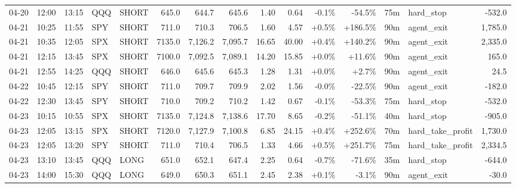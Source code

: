 \documentclass[11pt,a4paper,twoside]{article}
\begin{document}
\begin{landscape}
\begin{center}
\begin{longtable}{>{\color{txtmain}}l l l l l r r r r r r r r >{\color{txtmain}}l r}
04-20 & 12:00 & 13:15 & QQQ & SHORT & 645.0 & 644.7 & 645.6 & 1.40 & 0.64 & \textcolor{lossred}{-0.1\%} & \textcolor{lossred}{-54.5\%} & 75m & hard\_stop & \textcolor{lossred}{-532.0} \\
04-21 & 10:25 & 11:55 & SPY & SHORT & 711.0 & 710.3 & 706.5 & 1.60 & 4.57 & \textcolor{wingreen}{+0.5\%} & \textcolor{wingreen}{+186.5\%} & 90m & agent\_exit & \textcolor{wingreen}{1,785.0} \\
04-21 & 10:35 & 12:05 & SPX & SHORT & 7135.0 & 7,126.2 & 7,095.7 & 16.65 & 40.00 & \textcolor{wingreen}{+0.4\%} & \textcolor{wingreen}{+140.2\%} & 90m & agent\_exit & \textcolor{wingreen}{2,335.0} \\
04-21 & 12:15 & 13:45 & SPX & SHORT & 7100.0 & 7,092.5 & 7,089.1 & 14.20 & 15.85 & \textcolor{wingreen}{+0.0\%} & \textcolor{wingreen}{+11.6\%} & 90m & agent\_exit & \textcolor{wingreen}{165.0} \\
04-21 & 12:55 & 14:25 & QQQ & SHORT & 646.0 & 645.6 & 645.3 & 1.28 & 1.31 & \textcolor{wingreen}{+0.0\%} & \textcolor{wingreen}{+2.7\%} & 90m & agent\_exit & \textcolor{wingreen}{24.5} \\
04-22 & 10:45 & 12:15 & SPY & SHORT & 711.0 & 709.7 & 709.9 & 2.02 & 1.56 & \textcolor{lossred}{-0.0\%} & \textcolor{lossred}{-22.5\%} & 90m & agent\_exit & \textcolor{lossred}{-182.0} \\
04-22 & 12:30 & 13:45 & SPY & SHORT & 710.0 & 709.2 & 710.2 & 1.42 & 0.67 & \textcolor{lossred}{-0.1\%} & \textcolor{lossred}{-53.3\%} & 75m & hard\_stop & \textcolor{lossred}{-532.0} \\
04-23 & 10:15 & 10:55 & SPX & SHORT & 7135.0 & 7,124.8 & 7,138.6 & 17.70 & 8.65 & \textcolor{lossred}{-0.2\%} & \textcolor{lossred}{-51.1\%} & 40m & hard\_stop & \textcolor{lossred}{-905.0} \\
04-23 & 12:05 & 13:15 & SPX & SHORT & 7120.0 & 7,127.9 & 7,100.8 & 6.85 & 24.15 & \textcolor{wingreen}{+0.4\%} & \textcolor{wingreen}{+252.6\%} & 70m & hard\_take\_profit & \textcolor{wingreen}{1,730.0} \\
04-23 & 12:05 & 13:20 & SPY & SHORT & 711.0 & 710.4 & 706.5 & 1.33 & 4.66 & \textcolor{wingreen}{+0.5\%} & \textcolor{wingreen}{+251.7\%} & 75m & hard\_take\_profit & \textcolor{wingreen}{2,334.5} \\
04-23 & 13:10 & 13:45 & QQQ & LONG & 651.0 & 652.1 & 647.4 & 2.25 & 0.64 & \textcolor{lossred}{-0.7\%} & \textcolor{lossred}{-71.6\%} & 35m & hard\_stop & \textcolor{lossred}{-644.0} \\
04-23 & 14:00 & 15:30 & QQQ & LONG & 649.0 & 650.3 & 651.1 & 2.45 & 2.38 & \textcolor{wingreen}{+0.1\%} & \textcolor{lossred}{-3.1\%} & 90m & agent\_exit & \textcolor{lossred}{-30.0} \\

\end{longtable}
\end{center}
\end{landscape}
\end{document}

